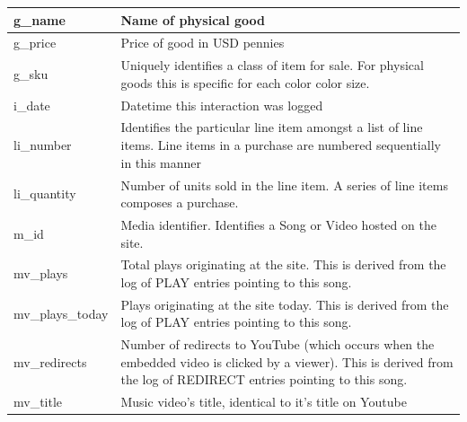 \documentclass[11pt, a4paper]{report}
\begin{document}
\begin{longtable}{|l|p{10cm}|}
g\_name                 & Name of physical good                                                                                                                                                 \\ \hline
g\_price                & Price of good in USD pennies                                                                                                                                          \\ \hline
g\_sku                  & Uniquely identifies a class of item for sale. For physical goods this is specific for each color color size.                                                          \\ \hline
i\_date                 & Datetime this interaction was logged                                                                                                                                  \\ \hline
li\_number              & Identifies the particular line item amongst a list of line items. Line items in a purchase are numbered sequentially in this manner                                   \\ \hline
li\_quantity            & Number of units sold in the line item. A series of line items composes a purchase.                                                                                    \\ \hline
m\_id                   & Media identifier. Identifies a Song or Video hosted on the site.                                                                                                      \\ \hline
mv\_plays               & Total plays originating at the site. This is derived from the log of PLAY entries pointing to this song.                                                              \\ \hline
mv\_plays\_today        & Plays originating at the site today. This is derived from the log of PLAY entries pointing to this song.                                                              \\ \hline
mv\_redirects           & Number of redirects to YouTube (which occurs when the embedded video is clicked by a viewer). This is derived from the log of REDIRECT entries pointing to this song. \\ \hline
mv\_title               & Music video’s title, identical to it’s title on Youtube                                                                                                               \\ \hline

\end{longtable}
\end{document}
